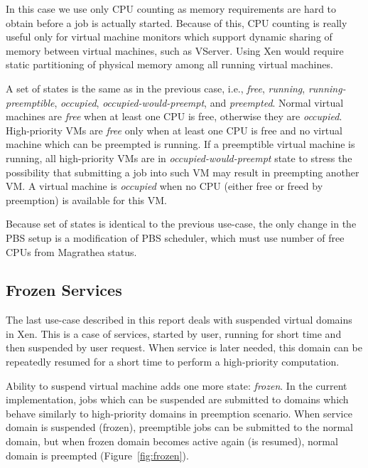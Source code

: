 \documentclass[a4paper]{article}
\begin{document}
In this case we use only CPU counting as memory requirements are hard to
obtain before a job is actually started. Because of this, CPU counting is
really useful only for virtual machine monitors which support dynamic sharing
of memory between virtual machines, such as VServer. Using Xen would require
static partitioning of physical memory among all running virtual machines.

A set of states is the same as in the previous case, i.e., \textit{free},
\textit{running}, \textit{running-preemptible}, \textit{occupied},
\textit{occupied-would-preempt}, and \textit{preempted}. Normal virtual
machines are \emph{free} when at least one CPU is free, otherwise they are
\emph{occupied}. High-priority VMs are \emph{free} only when at least one CPU
is free and no virtual machine which can be preempted is running. If a
preemptible virtual machine is running, all high-priority VMs are in
\emph{occupied-would-preempt} state to stress the possibility that submitting
a job into such VM may result in preempting another VM. A virtual machine is
\emph{occupied} when no CPU (either free or freed by preemption) is available
for this VM.

Because set of states is identical to the previous use-case, the only change
in the PBS setup is a modification of PBS scheduler, which must use number of
free CPUs from Magrathea status.

\subsection{Frozen Services}

The last use-case described in this report deals with suspended virtual
domains in Xen. This is a case of services, started by user, running for short
time and then suspended by user request. When service is later needed, this
domain can be repeatedly resumed for a short time to perform a high-priority
computation.

Ability to suspend virtual machine adds one more state: \textit{frozen}. In
the current implementation, jobs which can be suspended are submitted to
domains which behave similarly to high-priority domains in preemption
scenario. When service domain is suspended (frozen), preemptible jobs can be
submitted to the normal domain, but when frozen domain becomes active again
(is resumed), normal domain is preempted (Figure~\ref{fig:frozen}).
\end{document}
